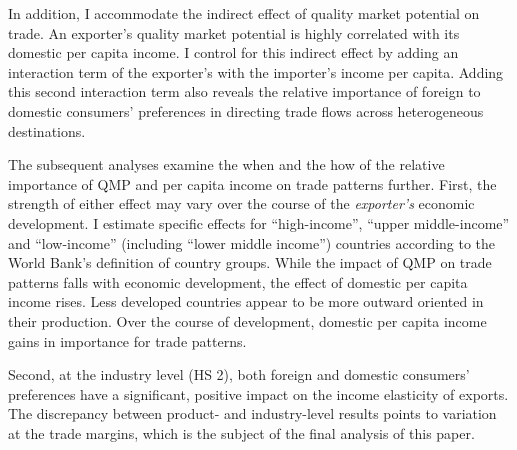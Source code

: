 \documentclass[12pt,a4paper,oneside,times]{article}   	%
\begin{document}
In addition, I accommodate  the indirect effect of quality market potential on trade. An exporter's quality market potential is highly correlated with its domestic per capita income. I control for this indirect effect by adding an interaction term of the exporter's with the importer's income per capita. Adding this second interaction term also reveals the relative importance of foreign to domestic consumers' preferences in directing trade flows across heterogeneous destinations. 
 

The subsequent analyses  examine the when and the how of the relative importance of QMP and per capita income on trade patterns further. First, the strength of either effect may vary over the course of the \emph{exporter's} economic development.  I estimate specific effects for ``high-income'', ``upper middle-income'' and ``low-income'' (including ``lower middle income'') countries according to the World Bank's definition of country groups.  While the impact of QMP on trade patterns falls with economic development, the effect of domestic per capita income rises. Less developed countries appear to be more outward oriented in their production. Over the course of development, domestic per capita income gains in importance for trade patterns. 

Second, at the industry level (HS 2), both foreign and domestic consumers' preferences have a significant, positive impact on the income elasticity of exports. The discrepancy between product- and industry-level results points to variation at the trade margins, which is the subject of the final analysis of this paper. 

\end{document}
